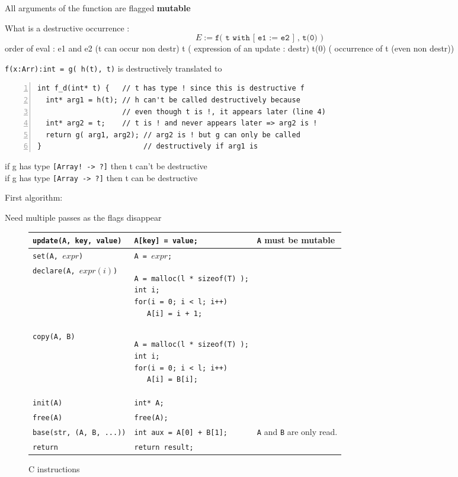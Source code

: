 \documentclass[12pt,a4paper]{article}
\newcommand{\cl}[1]{\texttt{#1}}
\newcommand{\mut}{  \textbf{ mutable } }
\begin{document}
All arguments of the function are flagged \mut 




What is a destructive occurrence :
$$ E :=  \cl{f(  t with [ e1 := e2 ] , t(0) )} $$
order of eval :
e1 and e2  (t can occur non destr)
t          ( expression of an update : destr)
t(0)       ( occurrence of t (even non destr))

\cl{f(x:Arr):int = g( h(t), t)}  is destructively translated to \\
\begin{lstlisting}[numbers=left,caption=Example]
int f_d(int* t) {   // t has type ! since this is destructive f
  int* arg1 = h(t); // h can't be called destructively because
                    // even though t is !, it appears later (line 4)
  int* arg2 = t;    // t is ! and never appears later => arg2 is !
  return g( arg1, arg2); // arg2 is ! but g can only be called
}                        // destructively if arg1 is
\end{lstlisting}

if g has type \cl{[Array! -> ?]} then t can't be destructive\\

if g has type \cl{[Array -> ?]} then t can be destructive

First algorithm:


Need multiple passes as the flags disappear


\begin{figure}[!ht]
\begin{tabular}{|p{50mm}|p{62mm}|p{45mm}|}
\hline
\cl{update(A, key, value)} & \cl{A[key] = value;} & \cl{A} must be \mut \\ \hline
\cl{set(A, $expr$)} & \cl{A = $expr$;} \\ \hline
\cl{declare(A, $expr(i)$)} & \begin{lstlisting}
A = malloc(l * sizeof(T) );
int i;
for(i = 0; i < l; i++)
   A[i] = i + 1;
\end{lstlisting} & \\ \hline
\cl{copy(A, B)} & \begin{lstlisting}
A = malloc(l * sizeof(T) );
int i;
for(i = 0; i < l; i++)
   A[i] = B[i];
\end{lstlisting} & \\ \hline
\cl{init(A)} & \cl{int* A;} & \\ \hline
\cl{free(A)} & \cl{free(A);} & \\ \hline
\cl{base(str, (A, B, ...))} & \cl{int aux = A[0] + B[1];} & \cl{A} and \cl{B} are only read. \\ \hline
\cl{return} & \cl{return result;} & \\ \hline
\end{tabular}
\caption{C instructions}
\end{figure}
\end{document}

